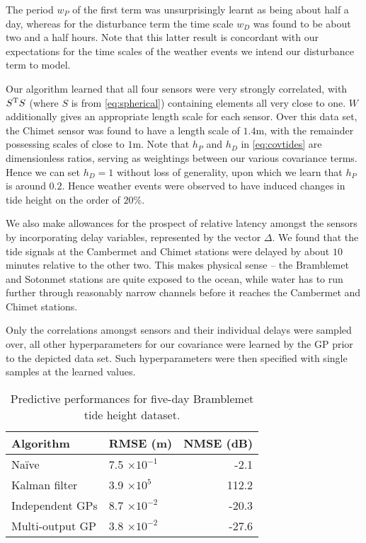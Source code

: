 \documentclass{acmtrans2m}
\newcommand{\dnt}[1]{_{{#1}}}
\begin{document}
The period $w_P$ of the first term was unsurprisingly learnt as being about half a day, whereas for the disturbance term the time scale $w\dnt{D}$ was found to be about two and a half hours. Note that this latter result is concordant with our expectations for the time scales of the weather events we intend our disturbance term to model. 

Our algorithm learned that all four sensors were very strongly correlated, with $S^{\mathrm{T}} S$ (where $S$ is from \eqref{eq:spherical})  containing elements all very close to one. $W$ additionally gives an appropriate length scale for each sensor. Over this data set, the Chimet sensor was found to have a length scale of $1.4$m, with the remainder possessing scales of close to $1$m. Note that $h\dnt{P}$ and $h\dnt{D}$ in \eqref{eq:covtides} are dimensionless ratios, serving as weightings between our various covariance terms. Hence we can set $h\dnt{D}=1$ without loss of generality, upon which we learn that $h\dnt{P}$ is around $0.2$. Hence weather events were observed to have induced changes in tide height on the order of $20\%$.

We also make allowances for the prospect of relative latency amongst the sensors by incorporating delay variables, represented by the vector $\Delta$. We found that the tide signals at the Cambermet and Chimet stations were delayed by about $10$ minutes relative to the other two. This makes physical sense -- the Bramblemet and Sotonmet stations are quite exposed to the ocean, while water has to run further through reasonably narrow channels before it reaches the Cambermet and Chimet stations.

Only the correlations amongst sensors and their individual delays were sampled over, all other hyperparameters for our covariance were learned by the GP prior to the depicted data set. Such hyperparameters were then specified with single samples at the learned values.

\begin{table}
\centering
\caption{Predictive performances for five-day Bramblemet tide height dataset.}
\label{tbl:TH_RMSEs}
 \begin{tabular}{@{}llr@{}}
 \\
 \toprule
Algorithm & RMSE (m) & NMSE (dB)\\
\midrule
Na\"{i}ve & 7.5 $\times 10^{-1}$ & -2.1 \\
Kalman filter & 3.9 $\times 10^5$ & 112.2 \\
Independent GPs & 8.7 $\times 10^{-2}$ & -20.3 \\
Multi-output GP & 3.8 $\times 10^{-2}$ & -27.6 \\
\bottomrule
\end{tabular}
\end{table}
\end{document}
